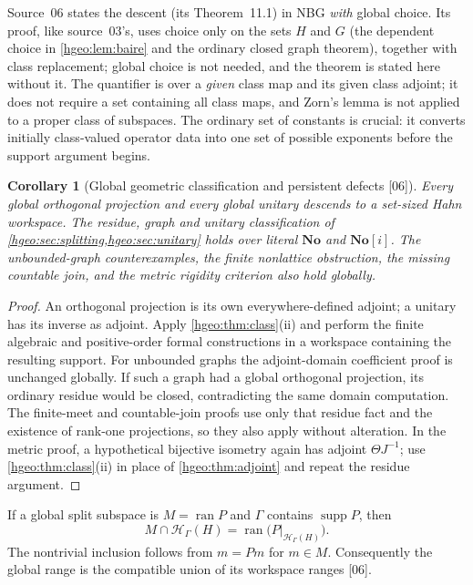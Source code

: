 \documentclass[11pt,letterpaper]{article}
\numberwithin{equation}{section}
\newtheorem{corollary}[corollary]{Corollary}
\theoremstyle{definition}
\theoremstyle{remark}
\newcommand{\No}{\mathbf{No}}
\newcommand{\HH}[1]{\mathscr H_\Gamma(#1)}
\newcommand{\supp}{\operatorname{supp}}
\newcommand{\ran}{\operatorname{ran}}
\newcommand{\src}[1]{\textup{\textsf{\small[#1]}}}
\begin{document}
Source~06 states the descent (its Theorem~11.1) in NBG \emph{with} global
choice. Its proof, like source~03's, uses choice only on the sets $H$ and
$G$ (the dependent choice in \cref{hgeo:lem:baire} and the ordinary closed
graph theorem), together with class replacement; global choice is not
needed, and the theorem is stated here without it. The quantifier is over a
\emph{given} class map and its given class adjoint; it does not require a
set containing all class maps, and Zorn's lemma is not applied to a proper
class of subspaces. The ordinary set of constants is crucial: it converts
initially class-valued operator data into one set of possible exponents
before the support argument begins.

\begin{corollary}[Global geometric classification and persistent defects
\src{06}]\label{hgeo:cor:globalgeometry}
Every global orthogonal projection and every global unitary descends to a
set-sized Hahn workspace. The residue, graph and unitary classification of
\cref{hgeo:sec:splitting,hgeo:sec:unitary} holds over literal $\No$ and
$\No[i]$. The unbounded-graph counterexamples, the finite nonlattice
obstruction, the missing countable join, and the metric rigidity criterion
also hold globally.
\end{corollary}
\begin{proof}
An orthogonal projection is its own everywhere-defined adjoint; a unitary
has its inverse as adjoint. Apply \cref{hgeo:thm:class}(ii) and perform the
finite algebraic and positive-order formal constructions in a workspace
containing the resulting support. For unbounded graphs the adjoint-domain
coefficient proof is unchanged globally. If such a graph had a global
orthogonal projection, its ordinary residue would be closed, contradicting
the same domain computation. The finite-meet and countable-join proofs use
only that residue fact and the existence of rank-one projections, so they
also apply without alteration. In the metric proof, a hypothetical bijective
isometry again has adjoint $\Theta J^{-1}$; use \cref{hgeo:thm:class}(ii) in
place of \cref{hgeo:thm:adjoint} and repeat the residue argument.
\end{proof}

If a global split subspace is $M=\ran P$ and $\Gamma$ contains $\supp P$, then
\begin{equation}\label{hgeo:eq:stageintersection}
 M\cap\HH{H}=\ran\bigl(P|_{\HH{H}}\bigr).
\end{equation}
The nontrivial inclusion follows from $m=Pm$ for $m\in M$. Consequently the
global range is the compatible union of its workspace ranges \src{06}.
\end{document}
